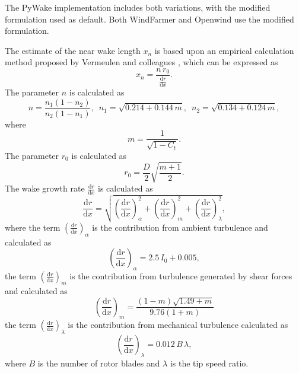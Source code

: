 \documentclass[11pt,a4paper]{article}
\begin{document}
The PyWake implementation includes both variations, with the modified formulation used as default. Both WindFarmer and Openwind use the modified formulation.

The estimate of the near wake length $x_{n}$ is based upon an empirical calculation method proposed by Vermeulen and colleagues \parencite{Vermeulen1980, VermeulenAndBuiltjes1981, VermeulenAndVijge1981}, which can be expressed as
\begin{equation}\label{eq:near_wake_length}
x_{n} = \frac{n \, r_{0}}{\frac{\textrm{d}r}{\textrm{d}x}}.
\end{equation}
The parameter $n$ is calculated as
\begin{equation}\label{eq:near_wake_length_n}
n = \frac{n_{1} \left( 1 - n_{2} \right)}{n_{2} \left( 1 - n_{1} \right)}, \enspace
n_{1} = \sqrt{0.214 + 0.144 \, m}, \enspace
n_{2} = \sqrt{0.134 + 0.124 \, m},
\end{equation}
where
\begin{equation}\label{eq:near_wake_length_m}
m = \frac{1}{\sqrt{1 - C_{t}}}.
\end{equation}
The parameter $r_{0}$ is calculated as
\begin{equation}\label{eq:near_wake_length_r0}
r_{0} = \frac{D}{2} \sqrt{\frac{m + 1}{2}}.
\end{equation}
The wake growth rate $\frac{\textrm{d}r}{\textrm{d}x}$ is calculated as
\begin{equation}\label{eq:near_wake_length_drdx}
\frac{\textrm{d}r}{\textrm{d}x} = \sqrt{\left(\frac{\textrm{d}r}{\textrm{d}x}\right)_{\alpha}^2 + \left(\frac{\textrm{d}r}{\textrm{d}x}\right)_{m}^2 + \left(\frac{\textrm{d}r}{\textrm{d}x}\right)_{\lambda}^2},
\end{equation}
where the term $\left(\frac{\textrm{d}r}{\textrm{d}x}\right)_{\alpha}$ is the contribution from ambient turbulence and calculated as
\begin{equation}\label{eq:near_wake_length_drdx_alpha}
\left(\frac{\textrm{d}r}{\textrm{d}x}\right)_{\alpha} = 2.5 \, I_{0} + 0.005,
\end{equation}
the term $\left(\frac{\textrm{d}r}{\textrm{d}x}\right)_{m}$ is the contribution from turbulence generated by shear forces and calculated as
\begin{equation}\label{eq:near_wake_length_drdx_m}
\left(\frac{\textrm{d}r}{\textrm{d}x}\right)_{m} = \frac{\left(1 - m\right) \sqrt{1.49 + m}}{9.76 \left(1 + m\right)}
\end{equation}
the term $\left(\frac{\textrm{d}r}{\textrm{d}x}\right)_{\lambda}$ is the contribution from mechanical turbulence calculated as
\begin{equation}\label{eq:near_wake_length_drdx_lambda}
\left(\frac{\textrm{d}r}{\textrm{d}x}\right)_{\lambda} = 0.012 \, B \, \lambda,
\end{equation}
where $B$ is the number of rotor blades and $\lambda$ is the tip speed ratio.
\end{document}
